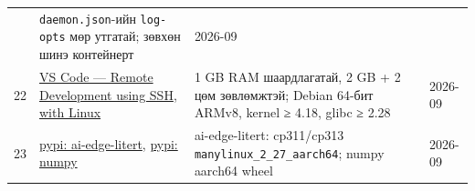 \begin{longtable}[]{@{}llll@{}}
\begin{minipage}[t]{0.22\columnwidth}
\end{minipage} & \begin{minipage}[t]{0.22\columnwidth}\raggedright
\texttt{daemon.json}-ийн \texttt{log-opts} мөр утгатай; зөвхөн шинэ контейнерт\strut
\end{minipage} & \begin{minipage}[t]{0.22\columnwidth}\raggedright
2026-09\strut
\end{minipage}\tabularnewline
\begin{minipage}[t]{0.22\columnwidth}\raggedright
22\strut
\end{minipage} & \begin{minipage}[t]{0.22\columnwidth}\raggedright
\href{https://code.visualstudio.com/docs/remote/ssh}{VS Code --- Remote Development using SSH}, \href{https://code.visualstudio.com/docs/remote/linux}{with Linux}\strut
\end{minipage} & \begin{minipage}[t]{0.22\columnwidth}\raggedright
1 GB RAM шаардлагатай, 2 GB + 2 цөм зөвлөмжтэй; Debian 64-бит ARMv8, kernel ≥ 4.18, glibc ≥ 2.28\strut
\end{minipage} & \begin{minipage}[t]{0.22\columnwidth}\raggedright
2026-09\strut
\end{minipage}\tabularnewline
\begin{minipage}[t]{0.22\columnwidth}\raggedright
23\strut
\end{minipage} & \begin{minipage}[t]{0.22\columnwidth}\raggedright
\href{https://pypi.org/project/ai-edge-litert/}{pypi: ai-edge-litert}, \href{https://pypi.org/project/numpy/}{pypi: numpy}\strut
\end{minipage} & \begin{minipage}[t]{0.22\columnwidth}\raggedright
ai-edge-litert: cp311/cp313 \texttt{manylinux\_\allowbreak{}2\_\allowbreak{}27\_\allowbreak{}aarch64}; numpy aarch64 wheel\strut
\end{minipage} & \begin{minipage}[t]{0.22\columnwidth}\raggedright
2026-09\strut
\end{minipage}\tabularnewline
\bottomrule
\end{longtable}\endgroup
